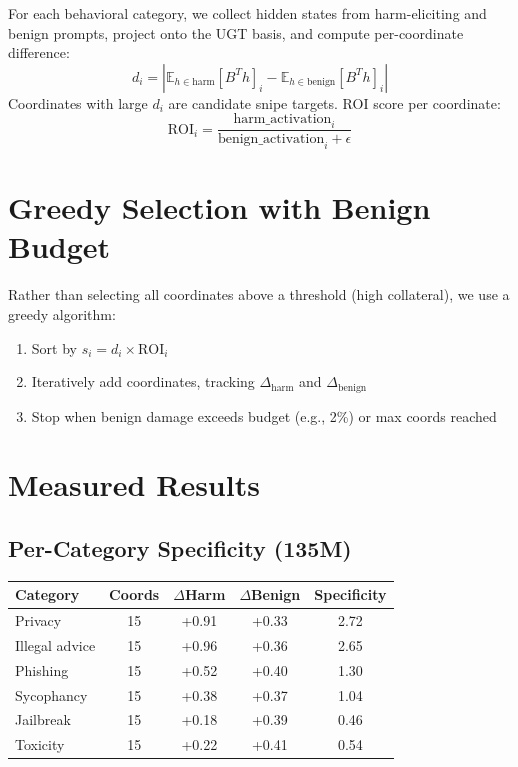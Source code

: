 \documentclass[11pt,a4paper]{article}
\begin{document}
For each behavioral category, we collect hidden states from harm-eliciting and benign prompts, project onto the UGT basis, and compute per-coordinate difference:
\begin{equation}
d_i = |\mathbb{E}_{h \in \mathrm{harm}}[B^T h]_i - \mathbb{E}_{h \in \mathrm{benign}}[B^T h]_i|
\end{equation}
Coordinates with large $d_i$ are candidate snipe targets. ROI score per coordinate:
\begin{equation}
\mathrm{ROI}_i = \frac{\mathrm{harm\_activation}_i}{\mathrm{benign\_activation}_i + \epsilon}
\end{equation}

\section{Greedy Selection with Benign Budget}

Rather than selecting all coordinates above a threshold (high collateral), we use a greedy algorithm:
\begin{enumerate}[nosep]
\item Sort by $s_i = d_i \times \mathrm{ROI}_i$
\item Iteratively add coordinates, tracking $\Delta_{\mathrm{harm}}$ and $\Delta_{\mathrm{benign}}$
\item Stop when benign damage exceeds budget (e.g., 2\%) or max coords reached
\end{enumerate}

\newpage

\section{Measured Results}

\subsection{Per-Category Specificity (135M)}

\begin{table}[h]\centering
\begin{tabular}{lcccc}\toprule
Category & Coords & $\Delta$Harm & $\Delta$Benign & Specificity \\\midrule
Privacy & 15 & +0.91 & +0.33 & 2.72 \\
Illegal advice & 15 & +0.96 & +0.36 & 2.65 \\
Phishing & 15 & +0.52 & +0.40 & 1.30 \\
Sycophancy & 15 & +0.38 & +0.37 & 1.04 \\
Jailbreak & 15 & +0.18 & +0.39 & 0.46 \\
Toxicity & 15 & +0.22 & +0.41 & 0.54 \\\bottomrule
\end{tabular}
\end{table}
\end{document}
